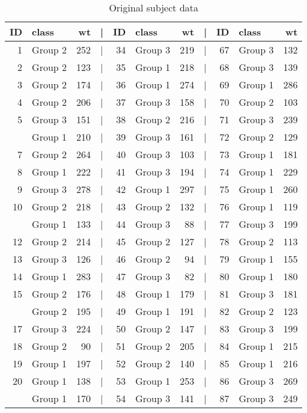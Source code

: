 \documentclass[smallextended]{svjour3}       %
\begin{document}
\begin{table}
\caption{\label{tab:subject-weights}Original subject data}
\centering
\begin{tabular}[t]{rlrlrlrlrlr}
\toprule
ID & class & wt & | & ID & class & wt & | & ID & class & wt\\
\midrule
1 & Group 2 & 252 & | & 34 & Group 3 & 219 & | & 67 & Group 3 & 132\\
2 & Group 2 & 123 & | & 35 & Group 1 & 218 & | & 68 & Group 3 & 139\\
3 & Group 2 & 174 & | & 36 & Group 1 & 274 & | & 69 & Group 1 & 286\\
4 & Group 2 & 206 & | & 37 & Group 3 & 158 & | & 70 & Group 2 & 103\\
5 & Group 3 & 151 & | & 38 & Group 2 & 216 & | & 71 & Group 3 & 239\\
\addlinespace
6 & Group 1 & 210 & | & 39 & Group 3 & 161 & | & 72 & Group 2 & 129\\
7 & Group 2 & 264 & | & 40 & Group 3 & 103 & | & 73 & Group 1 & 181\\
8 & Group 1 & 222 & | & 41 & Group 3 & 194 & | & 74 & Group 1 & 229\\
9 & Group 3 & 278 & | & 42 & Group 1 & 297 & | & 75 & Group 1 & 260\\
10 & Group 2 & 218 & | & 43 & Group 2 & 132 & | & 76 & Group 1 & 119\\
\addlinespace
11 & Group 1 & 133 & | & 44 & Group 3 & 88 & | & 77 & Group 3 & 199\\
12 & Group 2 & 214 & | & 45 & Group 2 & 127 & | & 78 & Group 2 & 113\\
13 & Group 3 & 126 & | & 46 & Group 2 & 94 & | & 79 & Group 1 & 155\\
14 & Group 1 & 283 & | & 47 & Group 3 & 82 & | & 80 & Group 1 & 180\\
15 & Group 2 & 176 & | & 48 & Group 1 & 179 & | & 81 & Group 3 & 181\\
\addlinespace
16 & Group 2 & 195 & | & 49 & Group 1 & 191 & | & 82 & Group 2 & 123\\
17 & Group 3 & 224 & | & 50 & Group 2 & 147 & | & 83 & Group 3 & 199\\
18 & Group 2 & 90 & | & 51 & Group 2 & 205 & | & 84 & Group 1 & 215\\
19 & Group 1 & 197 & | & 52 & Group 2 & 140 & | & 85 & Group 1 & 216\\
20 & Group 1 & 138 & | & 53 & Group 1 & 253 & | & 86 & Group 3 & 269\\
\addlinespace
21 & Group 1 & 170 & | & 54 & Group 3 & 141 & | & 87 & Group 3 & 249\\

\end{tabular}
\end{table}
\end{document}
